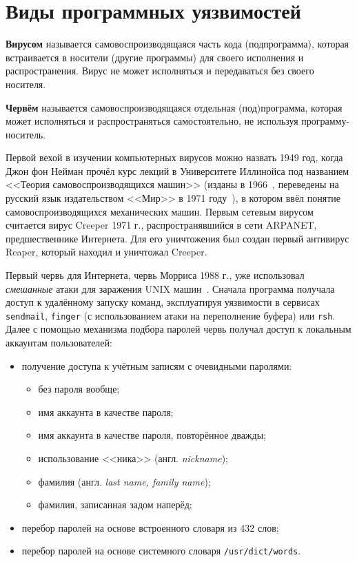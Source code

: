 \documentclass[10pt,a4paper,openany]{book}
\newcommand{\langen}[1]{англ. \foreignlanguage{english}{\textit{#1}}}
\begin{document}




\section{Виды программных уязвимостей}

\textbf{Вирусом} называется самовоспроизводящаяся часть кода (подпрограмма), которая встраивается в носители (другие программы) для своего исполнения и распространения. Вирус не может исполняться и передаваться без своего носителя.

\textbf{Червём} называется самовоспроизводящаяся отдельная (под)программа, которая может исполняться и распространяться самостоятельно, не используя программу-носитель.

Первой вехой в изучении компьютерных вирусов можно назвать 1949 год, когда Джон фон Нейман прочёл курс лекций в Университете Иллинойса под названием <<Теория самовоспроизводящихся машин>> (изданы в 1966~\cite{Neumann:1966}, переведены на русский язык издательством <<Мир>> в 1971 году~\cite{Neumann:1971}), в котором ввёл понятие самовоспроизводящихся механических машин. Первым сетевым вирусом считается вирус Creeper 1971 г., распространявшийся в сети ARPANET, предшественнике Интернета. Для его уничтожения был создан первый антивирус Reaper, который находил и уничтожал Creeper.

Первый червь для Интернета, червь Морриса 1988 г., уже использовал \emph{смешанные} атаки для заражения UNIX машин~\cite{EichinRochlis:1988, Spafford:1989}. Сначала программа получала доступ к удалённому запуску команд, эксплуатируя уязвимости в сервисах \texttt{sendmail}, \texttt{finger} (с использованием атаки на переполнение буфера) или \texttt{rsh}. Далее с помощью механизма подбора паролей червь получал доступ к локальным аккаунтам пользователей:
\begin{itemize}
    \item получение доступа к учётным записям с очевидными паролями:
		\begin{itemize}
			\item без пароля вообще;
			\item имя аккаунта в качестве пароля;
			\item имя аккаунта в качестве пароля, повторённое дважды;
			\item использование <<ника>> (\langen{nickname});
			\item фамилия (\langen{last name, family name});
			\item фамилия, записанная задом наперёд;
		\end{itemize}
		\item перебор паролей на основе встроенного словаря из 432 слов;
		\item перебор паролей на основе системного словаря \texttt{/usr/dict/words}.
\end{itemize}
\end{document}
